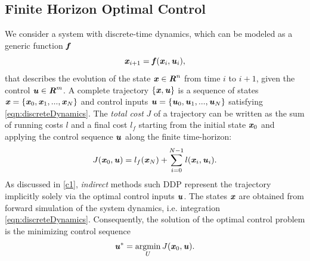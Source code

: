 \subsection{Finite Horizon Optimal Control}
We consider a system with discrete-time dynamics, which can be modeled as a generic function $\bm{\mathit{f}}$
\begin{equation}\label{eqn:discreteDynamics}
\bm{\mathit{x}}_{i+1}=\bm{\mathit{f}}(\bm{\mathit{x}}_i,\bm{\mathit{u}}_i), 
\end{equation}
that describes the evolution of the state $\bm{\mathit{x}}\in \bm{\mathit{R}}^n$ from time $i$ to $i+1$, given the control $\bm{\mathit{u}}\in \bm{\mathit{R}}^m$. A complete trajectory $\{\bm{\mathit{x}}, \bm{\mathit{u}}\}$ is a sequence of states $\bm{\mathit{x}}=\{\bm{\mathit{x}}_0, \bm{\mathit{x}}_1, ..., \bm{\mathit{x}}_N\}$ and control inputs $\bm{\mathit{u}}=\{\bm{\mathit{u}}_0, \bm{\mathit{u}}_1, ..., \bm{\mathit{u}}_N\}$ satisfying \cref{eqn:discreteDynamics}.
The \textit{total cost} $J$ of a trajectory can be written as the sum of running costs $l$ and a final cost $l_f$ starting from the initial state $\bm{\mathit{x}}_0$ and applying the control sequence $\bm{\mathit{u}}$ along the finite time-horizon:     
\begin{equation}\label{eqn:totalCost}
J(\bm{\mathit{x}}_0, \bm{\mathit{u}})=l_f(\bm{\mathit{x}}_N)+\sum_{i=0}^{N-1}l(\bm{\mathit{x}}_i,\bm{\mathit{u}}_i).
\end{equation}
As discussed in \cref{c1}, \textit{indirect} methods such \gls{DDP} represent the trajectory implicitly solely via the optimal control inputs $\bm{\mathit{u}}$. The states $\bm{\mathit{x}}$ are obtained from forward simulation of the system dynamics, i.e. integration \cref{eqn:discreteDynamics}. Consequently, the solution of the optimal control problem is the minimizing control sequence 
\begin{equation*}\label{eqn:minControl}
\bm{\mathit{u}}^*=\operatorname*{argmin}_U J(\bm{\mathit{x}}_0, \bm{\mathit{u}}). 
\end{equation*}

